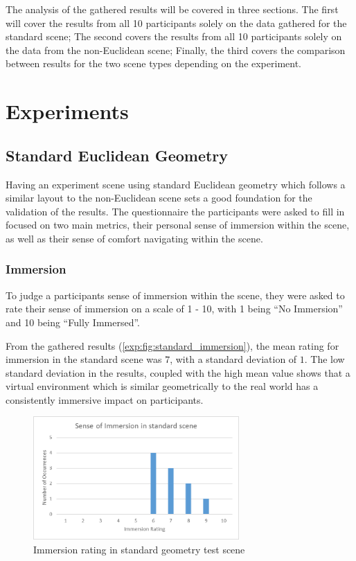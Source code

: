 		The analysis of the gathered results will be covered in three sections. The first will cover the results from all 10 participants solely on the data gathered for the standard scene; The second covers the results from all 10 participants solely on the data from the non-Euclidean scene; Finally, the third covers the comparison between results for the two scene types depending on the experiment. %

	\section{Experiments}
	\label{exp:exp}

		\subsection{Standard Euclidean Geometry}
		\label{exp:exp:standard}

			Having an experiment scene using standard Euclidean geometry which follows a similar layout to the non-Euclidean scene sets a good foundation for the validation of the results. %
			The questionnaire the participants were asked to fill in focused on two main metrics, their personal sense of immersion within the scene, as well as their sense of comfort navigating within the scene.

			\subsubsection{Immersion}

				To judge a participants sense of immersion within the scene, they were asked to rate their sense of immersion on a scale of 1 - 10, with 1 being \enquote{No Immersion} and 10 being \enquote{Fully Immersed}.

				From the gathered results (\autoref{exp:fig:standard_immersion}), the mean rating for immersion in the standard scene was $7$, with a standard deviation of $1$.
				The low standard deviation in the results, coupled with the high mean value shows that a virtual environment which is similar geometrically to the real world has a consistently immersive impact on participants.

				\begin{figure}[h]
					\includegraphics[width=0.7\textwidth]{Images/Standard_Immersion}
					\centering
					\caption{Immersion rating in standard geometry test scene}
					\label{exp:fig:standard_immersion}
				\end{figure}

